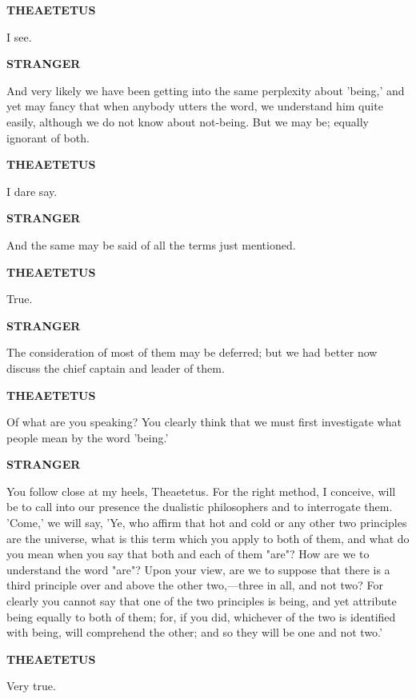 \documentclass[11pt,letter]{article}
\begin{document}
\par \textbf{THEAETETUS}
\par   I see.

\par \textbf{STRANGER}
\par   And very likely we have been getting into the same perplexity about 'being,' and yet may fancy that when anybody utters the word, we understand him quite easily, although we do not know about not-being. But we may be; equally ignorant of both.

\par \textbf{THEAETETUS}
\par   I dare say.

\par \textbf{STRANGER}
\par   And the same may be said of all the terms just mentioned.

\par \textbf{THEAETETUS}
\par   True.

\par \textbf{STRANGER}
\par   The consideration of most of them may be deferred; but we had better now discuss the chief captain and leader of them.

\par \textbf{THEAETETUS}
\par   Of what are you speaking? You clearly think that we must first investigate what people mean by the word 'being.'

\par \textbf{STRANGER}
\par   You follow close at my heels, Theaetetus. For the right method, I conceive, will be to call into our presence the dualistic philosophers and to interrogate them. 'Come,' we will say, 'Ye, who affirm that hot and cold or any other two principles are the universe, what is this term which you apply to both of them, and what do you mean when you say that both and each of them "are"? How are we to understand the word "are"? Upon your view, are we to suppose that there is a third principle over and above the other two,—three in all, and not two? For clearly you cannot say that one of the two principles is being, and yet attribute being equally to both of them; for, if you did, whichever of the two is identified with being, will comprehend the other; and so they will be one and not two.'

\par \textbf{THEAETETUS}
\par   Very true.
\end{document}
